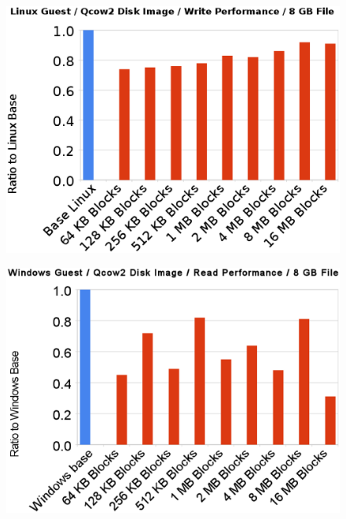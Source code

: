 \begin{figure}[tbp]
\begin{centering}
\label{fig:linux-write}
\includegraphics[scale=.7,angle=90]{figs/linux-write}
\end{centering}
\end{figure}

\begin{figure}[tbp]
\begin{centering}
\label{fig:windows-read}
\includegraphics[scale=.7,angle=90]{figs/windows-read}
\end{centering}
\end{figure}

